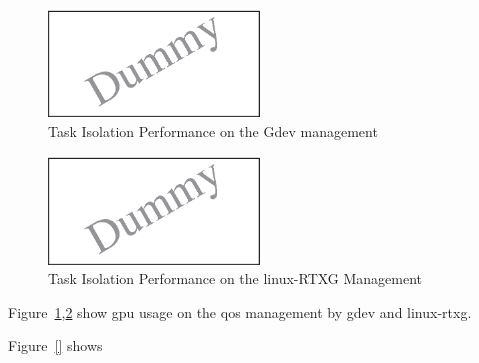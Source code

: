 \begin{figure}[t]
\begin{center}
\includegraphics[width=0.5\textwidth]{img/dummy}
\caption{Task Isolation Performance on the Gdev management}
\end{center}
\label{fig:qos_gdev}
\end{figure}
\begin{figure}[t]
\begin{center}
\includegraphics[width=0.5\textwidth]{img/dummy}
\caption{Task Isolation Performance on the linux-RTXG Management}
\end{center}
\label{fig:qos_rtx}
\end{figure}

Figure~\ref{fig:qos_gdev},\ref{fig:qos_rtx} show gpu usage on the qos management by gdev and linux-rtxg.



Figure~\ref{} shows 
